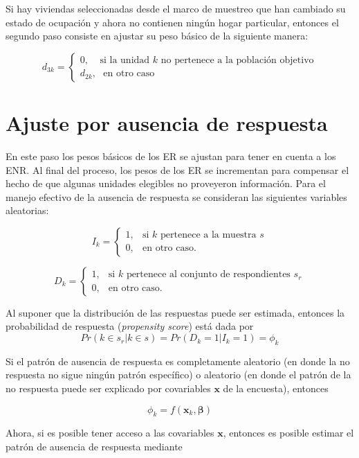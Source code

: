 \documentclass[
  10pt,
  spanish,
]{book}
\begin{document}
Si hay viviendas seleccionadas desde el marco de muestreo que han cambiado su estado de ocupación y ahora no contienen ningún hogar particular, entonces el segundo paso consiste en ajustar su peso básico de la siguiente manera:

\[
d_{3k} = 
\begin{cases}
0, \ \ \ \ \ \text{si la unidad $k$ no pertenece a la población objetivo}\\
d_{2k},\ \ \ \text{en otro caso }
\end{cases}
\]

\hypertarget{ajuste-por-ausencia-de-respuesta}{%
\section{Ajuste por ausencia de respuesta}\label{ajuste-por-ausencia-de-respuesta}}

En este paso los pesos básicos de los ER se ajustan para tener en cuenta a los ENR. Al final del proceso, los pesos de los ER se incrementan para compensar el hecho de que algunas unidades elegibles no proveyeron información. Para el manejo efectivo de la ausencia de respuesta se consideran las siguientes variables aleatorias:

\[
I_k=
\begin{cases}
1,  &\text{si $k$ pertenece a la muestra $s$}\\
0,  &\text{en otro caso.}
\end{cases}
\]

\[
D_k=
\begin{cases}
1,  &\text{si $k$ pertenece al conjunto de respondientes $s_r$}\\
0,  &\text{en otro caso.}
\end{cases}
\]

Al suponer que la distribución de las respuestas puede ser estimada, entonces la probabilidad de respuesta (\emph{propensity score}) está dada por
\[
Pr(k\in s_r|k\in s)=Pr(D_k = 1|I_k = 1)=\phi_k 
\]

Si el patrón de ausencia de respuesta es completamente aleatorio (en donde la no respuesta no sigue ningún patrón específico) o aleatorio (en donde el patrón de la no respuesta puede ser explicado por covariables \(\mathbf{x}\) de la encuesta), entonces

\[
\phi_k = f(\mathbf{x}_k, \boldsymbol{\beta})
\]

Ahora, si es posible tener acceso a las covariables \(\mathbf{x}\), entonces es posible estimar el patrón de ausencia de respuesta mediante
\end{document}
